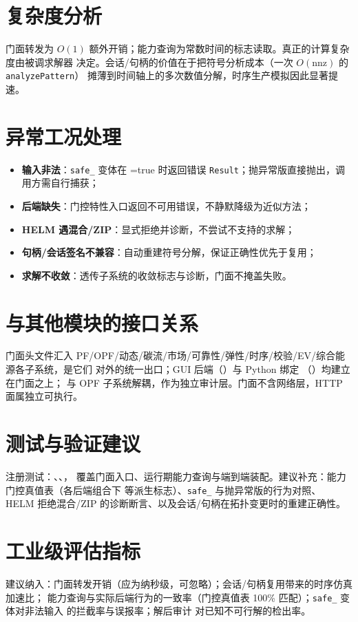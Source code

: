 \documentclass[UTF8,fontset=fandol,a4paper,11pt]{ctexart}
\begin{document}
\section{复杂度分析}
门面转发为 $O(1)$ 额外开销；能力查询为常数时间的标志读取。真正的计算复杂度由被调求解器
决定。会话/句柄的价值在于把符号分析成本（一次 $O(\text{nnz})$ 的 \texttt{analyzePattern}）
摊薄到时间轴上的多次数值分解，时序生产模拟因此显著提速。

\section{异常工况处理}
\begin{itemize}
  \item \textbf{输入非法}：\texttt{safe\_} 变体在 =true 时返回错误
        \texttt{Result}；抛异常版直接抛出，调用方需自行捕获；
  \item \textbf{后端缺失}：门控特性入口返回不可用错误，不静默降级为近似方法；
  \item \textbf{HELM 遇混合/ZIP}：显式拒绝并诊断，不尝试不支持的求解；
  \item \textbf{句柄/会话签名不兼容}：自动重建符号分解，保证正确性优先于复用；
  \item \textbf{求解不收敛}：透传子系统的收敛标志与诊断，门面不掩盖失败。
\end{itemize}

\section{与其他模块的接口关系}
门面头文件汇入 PF/OPF/动态/碳流/市场/可靠性/弹性/时序/校验/EV/综合能源各子系统，是它们
对外的统一出口；GUI 后端（）与 Python 绑定
（）均建立在门面之上； 与 OPF
子系统解耦，作为独立审计层。门面不含网络层，HTTP 面属独立可执行。

\section{测试与验证建议}
注册测试：、、，
覆盖门面入口、运行期能力查询与端到端装配。建议补充：能力门控真值表（各后端组合下
 等派生标志）、\texttt{safe\_} 与抛异常版的行为对照、
HELM 拒绝混合/ZIP 的诊断断言、以及会话/句柄在拓扑变更时的重建正确性。

\section{工业级评估指标}
建议纳入：门面转发开销（应为纳秒级，可忽略）；会话/句柄复用带来的时序仿真加速比；
能力查询与实际后端行为的一致率（门控真值表 100\% 匹配）；\texttt{safe\_} 变体对非法输入
的拦截率与误报率；解后审计  对已知不可行解的检出率。
\end{document}
